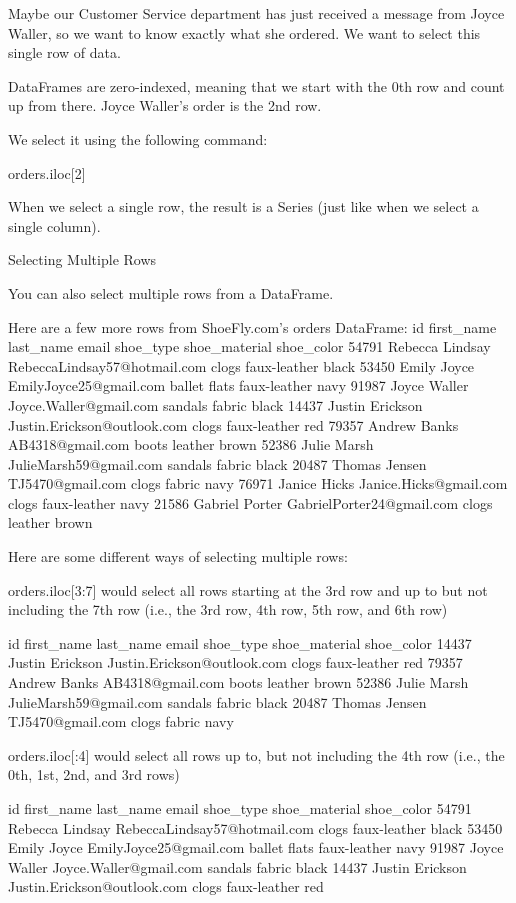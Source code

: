 \documentclass{journal}
\begin{document}
Maybe our Customer Service department has just received a message from Joyce Waller, so we want to know exactly what she ordered. We want to select this single row of data.

DataFrames are zero-indexed, meaning that we start with the 0th row and count up from there. Joyce Waller's order is the 2nd row.

We select it using the following command:

orders.iloc[2]

When we select a single row, the result is a Series (just like when we select a single column).

Selecting Multiple Rows

You can also select multiple rows from a DataFrame.

Here are a few more rows from ShoeFly.com's orders DataFrame:
id 	first_name 	last_name 	email 	shoe_type 	shoe_material 	shoe_color
54791 	Rebecca 	Lindsay 	RebeccaLindsay57@hotmail.com 	clogs 	faux-leather 	black
53450 	Emily 	Joyce 	EmilyJoyce25@gmail.com 	ballet flats 	faux-leather 	navy
91987 	Joyce 	Waller 	Joyce.Waller@gmail.com 	sandals 	fabric 	black
14437 	Justin 	Erickson 	Justin.Erickson@outlook.com 	clogs 	faux-leather 	red
79357 	Andrew 	Banks 	AB4318@gmail.com 	boots 	leather 	brown
52386 	Julie 	Marsh 	JulieMarsh59@gmail.com 	sandals 	fabric 	black
20487 	Thomas 	Jensen 	TJ5470@gmail.com 	clogs 	fabric 	navy
76971 	Janice 	Hicks 	Janice.Hicks@gmail.com 	clogs 	faux-leather 	navy
21586 	Gabriel 	Porter 	GabrielPorter24@gmail.com 	clogs 	leather 	brown

Here are some different ways of selecting multiple rows:

    orders.iloc[3:7] would select all rows starting at the 3rd row and up to but not including the 7th row (i.e., the 3rd row, 4th row, 5th row, and 6th row)


id 	first_name 	last_name 	email 	shoe_type 	shoe_material 	shoe_color
14437 	Justin 	Erickson 	Justin.Erickson@outlook.com 	clogs 	faux-leather 	red
79357 	Andrew 	Banks 	AB4318@gmail.com 	boots 	leather 	brown
52386 	Julie 	Marsh 	JulieMarsh59@gmail.com 	sandals 	fabric 	black
20487 	Thomas 	Jensen 	TJ5470@gmail.com 	clogs 	fabric 	navy

    orders.iloc[:4] would select all rows up to, but not including the 4th row (i.e., the 0th, 1st, 2nd, and 3rd rows)


id 	first_name 	last_name 	email 	shoe_type 	shoe_material 	shoe_color
54791 	Rebecca 	Lindsay 	RebeccaLindsay57@hotmail.com 	clogs 	faux-leather 	black
53450 	Emily 	Joyce 	EmilyJoyce25@gmail.com 	ballet flats 	faux-leather 	navy
91987 	Joyce 	Waller 	Joyce.Waller@gmail.com 	sandals 	fabric 	black
14437 	Justin 	Erickson 	Justin.Erickson@outlook.com 	clogs 	faux-leather 	red
\end{document}
